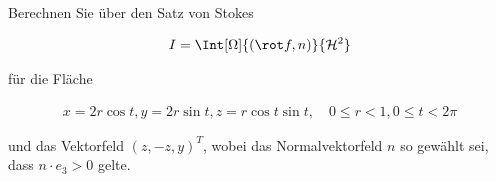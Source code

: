 
\begin{exercise}

Berechnen Sie über den Satz von Stokes

\begin{align*}
    I
    =
    \Int[\Omega]
    {
        (\rot f, n)
    }{
        \mathcal H^2
    }
\end{align*}

für die Fläche

\begin{align*}
    x = 2 r \cos t,
    y = 2 r \sin t,
    z = r \cos t \sin t,
    \quad
    0 \leq r < 1,
    0 \leq t < 2 \pi
\end{align*}

und das Vektorfeld $(z, -z, y)^T$, wobei das Normalvektorfeld $n$ so gewählt sei, dass $n \cdot e_3 > 0$ gelte.

\end{exercise}


